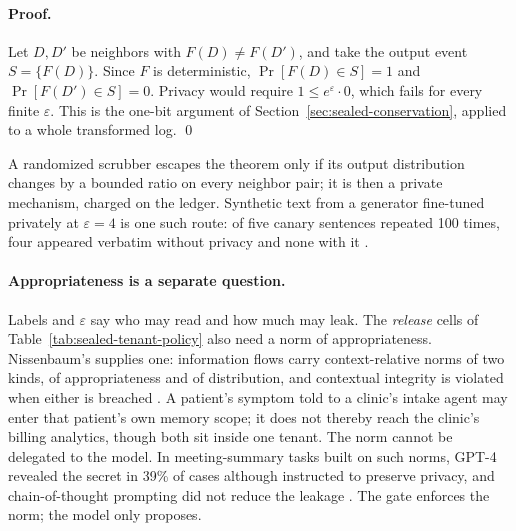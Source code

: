 \paragraph{Proof.}
Let $D,D'$ be neighbors with $F(D)\ne F(D')$, and take the output event
$S=\{F(D)\}$. Since $F$ is deterministic, $\Pr[F(D)\in S]=1$ and
$\Pr[F(D')\in S]=0$. Privacy would require $1\le e^{\varepsilon}\cdot0$, which
fails for every finite $\varepsilon$. This is the one-bit argument of
Section~\ref{sec:sealed-conservation}, applied to a whole transformed log.
\qed

A randomized scrubber escapes the theorem only if its output distribution
changes by a bounded ratio on every neighbor pair; it is then a private
mechanism, charged on the ledger. Synthetic text from a generator
fine-tuned privately at $\varepsilon=4$ is one such route: of five canary
sentences repeated 100 times, four appeared verbatim without privacy and none
with it .

\paragraph{Appropriateness is a separate question.}
Labels and $\varepsilon$ say who may read and how much may leak. The
\emph{release} cells of Table~\ref{tab:sealed-tenant-policy} also need a norm
of appropriateness. Nissenbaum's  supplies one: information flows carry context-relative norms of
two kinds, of appropriateness and of distribution, and contextual integrity
is violated when either is breached . A patient's
symptom told to a clinic's intake agent may enter that patient's own memory
scope; it does not thereby reach the clinic's billing analytics, though both
sit inside one tenant. The norm cannot be delegated to the model. In
meeting-summary tasks built on such norms, GPT-4 revealed the secret in 39\%
of cases although instructed to preserve privacy, and chain-of-thought
prompting did not reduce the leakage . The
gate enforces the norm; the model only proposes.

